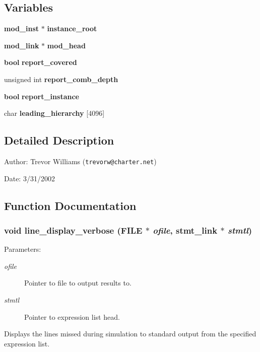 \subsection*{Variables}
\begin{CompactItemize}
\item 
{\bf mod\_\-inst} $\ast$ {\bf instance\_\-root}
\item 
{\bf mod\_\-link} $\ast$ {\bf mod\_\-head}
\item 
{\bf bool} {\bf report\_\-covered}
\item 
unsigned int {\bf report\_\-comb\_\-depth}
\item 
{\bf bool} {\bf report\_\-instance}
\item 
char {\bf leading\_\-hierarchy} [4096]
\end{CompactItemize}


\subsection{Detailed Description}
\begin{Desc}
\item[Author:]Trevor Williams ({\tt trevorw@charter.net}) \end{Desc}
\begin{Desc}
\item[Date:]3/31/2002\end{Desc}


\subsection{Function Documentation}
\subsubsection{\setlength{\rightskip}{0pt plus 5cm}void line\_\-display\_\-verbose (FILE $\ast$ {\em ofile}, {\bf stmt\_\-link} $\ast$ {\em stmtl})}\label{line_8c_a9}


\begin{Desc}
\item[Parameters:]
\begin{description}
\item[{\em ofile}]Pointer to file to output results to. \item[{\em stmtl}]Pointer to expression list head.\end{description}
\end{Desc}
Displays the lines missed during simulation to standard output from the specified expression list. 
